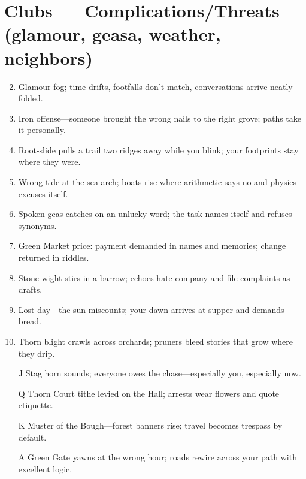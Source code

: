 \section{Clubs --- Complications/Threats (glamour, geasa, weather, neighbors)}
\label{sec:aelinnel-complications}
\begin{enumerate}
\setcounter{enumi}{1}
\item Glamour fog; time drifts, footfalls don't match, conversations arrive neatly folded.
\item Iron offense---someone brought the wrong nails to the right grove; paths take it personally.
\item Root-slide pulls a trail two ridges away while you blink; your footprints stay where they were.
\item Wrong tide at the sea-arch; boats rise where arithmetic says no and physics excuses itself.
\item Spoken geas catches on an unlucky word; the task names itself and refuses synonyms.
\item Green Market price: payment demanded in names and memories; change returned in riddles.
\item Stone-wight stirs in a barrow; echoes hate company and file complaints as drafts.
\item Lost day---the sun miscounts; your dawn arrives at supper and demands bread.
\item Thorn blight crawls across orchards; pruners bleed stories that grow where they drip.
\item[J] Stag horn sounds; everyone owes the chase---especially you, especially now.
\item[Q] Thorn Court tithe levied on the Hall; arrests wear flowers and quote etiquette.
\item[K] Muster of the Bough---forest banners rise; travel becomes trespass by default.
\item[A] Green Gate yawns at the wrong hour; roads rewire across your path with excellent logic.
\end{enumerate}

